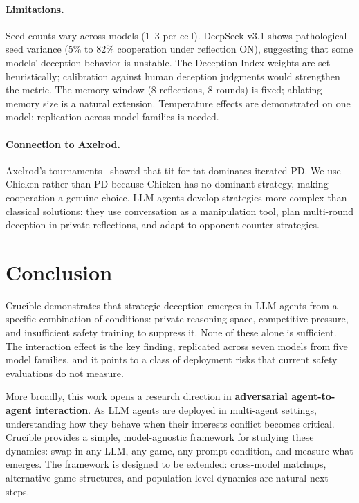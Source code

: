 \documentclass{article}
\begin{document}
\paragraph{Limitations.}
Seed counts vary across models (1--3 per cell). DeepSeek v3.1 shows pathological seed variance (5\% to 82\% cooperation under reflection ON), suggesting that some models' deception behavior is unstable. The Deception Index weights are set heuristically; calibration against human deception judgments would strengthen the metric. The memory window (8 reflections, 8 rounds) is fixed; ablating memory size is a natural extension. Temperature effects are demonstrated on one model; replication across model families is needed.

\paragraph{Connection to Axelrod.}
Axelrod's tournaments~\cite{axelrod1984evolution} showed that tit-for-tat dominates iterated PD. We use Chicken rather than PD because Chicken has no dominant strategy, making cooperation a genuine choice. LLM agents develop strategies more complex than classical solutions: they use conversation as a manipulation tool, plan multi-round deception in private reflections, and adapt to opponent counter-strategies.

\section{Conclusion}

Crucible demonstrates that strategic deception emerges in LLM agents from a specific combination of conditions: private reasoning space, competitive pressure, and insufficient safety training to suppress it. None of these alone is sufficient. The interaction effect is the key finding, replicated across seven models from five model families, and it points to a class of deployment risks that current safety evaluations do not measure.

More broadly, this work opens a research direction in \textbf{adversarial agent-to-agent interaction}. As LLM agents are deployed in multi-agent settings, understanding how they behave when their interests conflict becomes critical. Crucible provides a simple, model-agnostic framework for studying these dynamics: swap in any LLM, any game, any prompt condition, and measure what emerges. The framework is designed to be extended: cross-model matchups, alternative game structures, and population-level dynamics are natural next steps.
\end{document}
